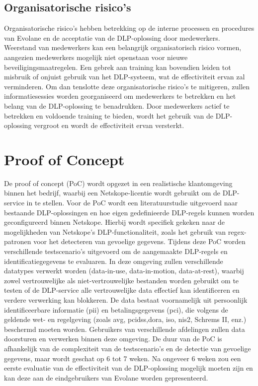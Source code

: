\subsection{Organisatorische risico's}

Organisatorische risico's hebben betrekking op de interne processen en procedures van Evolane en de acceptatie van de DLP-oplossing door medewerkers. 
Weerstand van medewerkers kan een belangrijk organisatorisch risico vormen, aangezien medewerkers mogelijk niet openstaan voor nieuwe beveiligingsmaatregelen. 
Een gebrek aan training kan bovendien leiden tot misbruik of onjuist gebruik van het DLP-systeem, wat de effectiviteit ervan zal verminderen. 
Om dan tenslotte deze organisatorische risico's te mitigeren, zullen informatiesessies worden georganiseerd om medewerkers te betrekken en het belang van de DLP-oplossing te benadrukken. 
Door medewerkers actief te betrekken en voldoende training te bieden, wordt het gebruik van de DLP-oplossing vergroot en wordt de effectiviteit ervan versterkt.

\section{Proof of Concept}%


De proof of concept (PoC) wordt opgezet in een realistische klantomgeving binnen het bedrijf, waarbij een Netskope-licentie wordt gebruikt om de DLP-service in te stellen. 
Voor de PoC wordt een literatuurstudie uitgevoerd naar bestaande DLP-oplossingen en hoe eigen gedefinieerde DLP-regels kunnen worden geconfigureerd binnen Netskope.
Hierbij wordt specifiek gekeken naar de mogelijkheden van Netskope's DLP-functionaliteit, zoals het gebruik van regex-patronen voor het detecteren van gevoelige gegevens.
Tijdens deze PoC worden verschillende testscenario's uitgevoerd om de aangemaakte DLP-regels en identificatiegegevens te evaluaren.
In deze omgeving zullen verschillende datatypes verwerkt worden (data-in-use, data-in-motion, data-at-rest), 
waarbij zowel vertrouwelijke als niet\--vertr\-ouwelijke bestanden worden gebruikt om te testen of de DLP-service alle vertrouwelijke data effectief kan identificeren en verdere verwerking kan blokkeren. 
De data bestaat voornamelijk uit persoonlijk identificeerbare informatie (\gls{pii}) en betalingsgegevens (\gls{pci}), die volgens de geldende wet- en regelgeving (zoals \gls{avg}, \gls{pcidss},\gls{dora}, \gls{iso}, \gls{nis2}, Schrems II, enz.) beschermd moeten worden. 
Gebruikers van verschillende afdelingen zullen data doorsturen en verwerken binnen deze omgeving. 
De duur van de PoC is afhankelijk van de complexiteit van de testscenario's en de detectie van gevoelige gegevens, 
maar wordt geschat op 6 tot 7 weken. 
Na ongeveer 6 weken zou een eerste evaluatie van de effectiviteit van de DLP-oplossing mogelijk moeten zijn 
en kan deze aan de eindgebruikers van Evolane worden gepresenteerd. 

